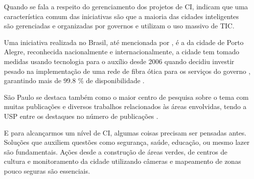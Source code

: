 Quando se fala a respeito do gerenciamento dos projetos de CI,  indicam que uma característica comum das iniciativas são que a maioria das cidades inteligentes são gerenciadas e organizadas por governos e utilizam o uso massivo de TIC. 

Uma iniciativa realizada no Brasil, até mencionada por , é a da cidade de Porto Alegre, reconhecida nacionalmente e internacionalmente, a cidade tem tomado medidas usando tecnologia para o auxílio desde 2006 quando decidiu investir pesado na implementação de uma rede de fibra ótica para os serviços do governo , garantindo mais de 99.8 \% de disponibilidade \cite{weiss}.

 São Paulo se destaca também como o maior centro de pesquisa sobre o tema com muitas publicações e diversos trabalhos relacionados às áreas envolvidas, tendo a USP entre os destaques no número de publicações \cite{lazzaretti}. 


E para alcançarmos um nível de CI, algumas coisas precisam ser pensadas antes. Soluções que auxiliem questões como segurança, saúde, educação, ou mesmo lazer são fundamentais. Ações desde a construção de áreas verdes, de centros de cultura e monitoramento da cidade utilizando câmeras e mapeamento de zonas pouco seguras são essenciais. 

